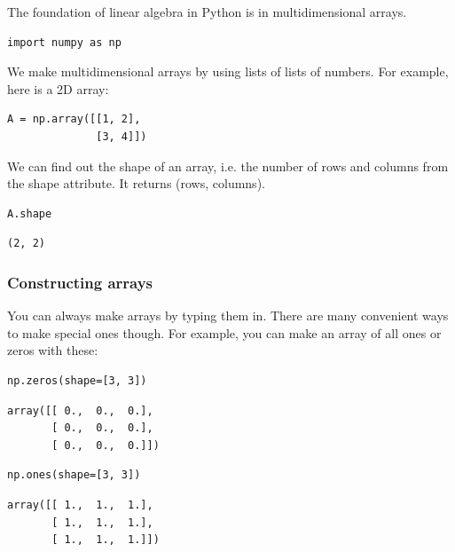 \documentclass[11pt]{article}
\begin{document}
The foundation of linear algebra in Python is in multidimensional arrays.

\begin{verbatim}
import numpy as np
\end{verbatim}

We make multidimensional arrays by using lists of lists of numbers. For example, here is a 2D array:

\begin{verbatim}
A = np.array([[1, 2],
              [3, 4]])
\end{verbatim}

We can find out the shape of an array, i.e. the number of rows and columns from the shape attribute. It returns (rows, columns).

\begin{verbatim}
A.shape
\end{verbatim}

\begin{verbatim}
(2, 2)
\end{verbatim}

\subsubsection{Constructing arrays}
\label{sec:org37b077f}

You can always make arrays by typing them in. There are many convenient ways to make special ones though. For example, you can make an array of all ones or zeros with these:

\begin{verbatim}
np.zeros(shape=[3, 3])
\end{verbatim}

\begin{verbatim}
array([[ 0.,  0.,  0.],
       [ 0.,  0.,  0.],
       [ 0.,  0.,  0.]])
\end{verbatim}


\begin{verbatim}
np.ones(shape=[3, 3])
\end{verbatim}

\begin{verbatim}
array([[ 1.,  1.,  1.],
       [ 1.,  1.,  1.],
       [ 1.,  1.,  1.]])
\end{verbatim}
\end{document}
